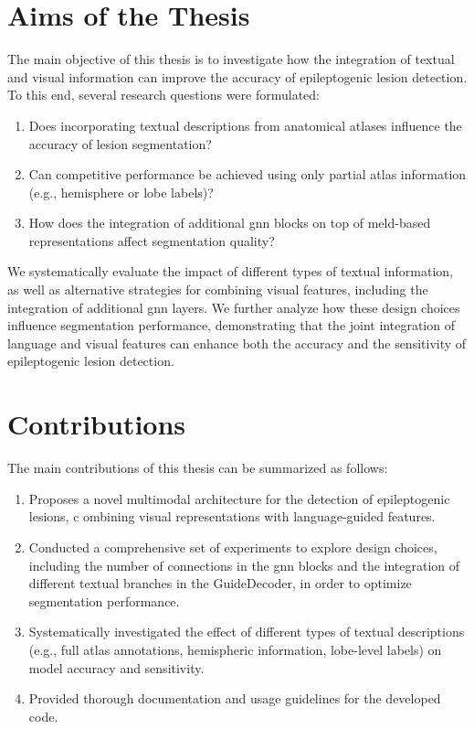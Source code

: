 \documentclass[FCD_GNN.tex]{subfiles}
\begin{document}
\section{Aims of the Thesis}
The main objective of this thesis is to investigate how the integration of textual and visual information 
can improve the accuracy of epileptogenic lesion detection. 
To this end, several research questions were formulated:

\begin{enumerate}
    \item Does incorporating textual descriptions from anatomical atlases influence the accuracy of lesion segmentation?
    \item Can competitive performance be achieved using only partial atlas information (e.g., hemisphere or lobe labels)?
    \item How does the integration of additional \ac{gnn} blocks on top of \ac{meld}-based representations affect segmentation quality?
\end{enumerate}

We systematically evaluate the impact of different types of textual information, as well as alternative strategies 
for combining visual features, including the integration of additional \ac{gnn} layers. 
We further analyze how these design choices influence segmentation performance, 
demonstrating that the joint integration of language and visual features can enhance both the accuracy 
and the sensitivity of epileptogenic lesion detection.

\section{Contributions}

The main contributions of this thesis can be summarized as follows:

\begin{enumerate}
    \item Proposes a novel multimodal architecture for the detection of epileptogenic lesions, c
    ombining visual representations with language-guided features.
    \item Conducted a comprehensive set of experiments to explore design choices, including the number of 
    connections in the \ac{gnn} blocks and the integration of different textual branches in the GuideDecoder, 
    in order to optimize segmentation performance.
    \item Systematically investigated the effect of different types of textual descriptions (e.g., 
    full atlas annotations, hemispheric information, lobe-level labels) on model accuracy and sensitivity.
    \item Provided thorough documentation and usage guidelines for the developed code.
\end{enumerate}
\end{document}
